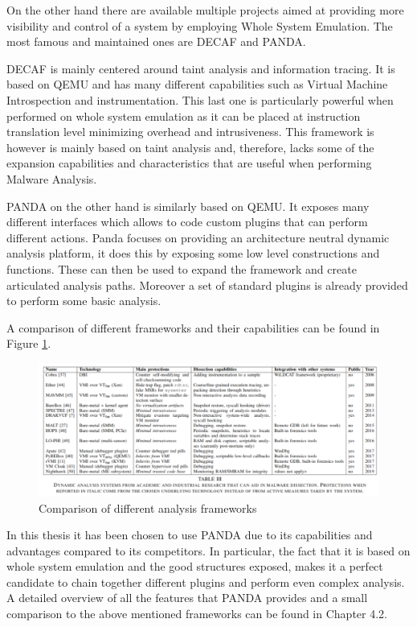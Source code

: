 On the other hand there are available multiple projects aimed at providing more visibility and control of a system by employing Whole System Emulation. The most famous and maintained ones are DECAF and PANDA. 

DECAF is mainly centered around taint analysis and information tracing. It is based on QEMU and has many different capabilities such as Virtual Machine Introspection and instrumentation. This last one is particularly powerful when performed on whole system emulation as it can be placed at instruction translation level minimizing overhead and intrusiveness. This framework is however is mainly based on taint analysis and, therefore, lacks some of the expansion capabilities and characteristics that are useful when performing Malware Analysis. 

PANDA on the other hand is similarly based on QEMU. It exposes many different interfaces which allows to code custom plugins that can perform different actions. Panda focuses on providing an architecture neutral dynamic analysis platform, it does this by exposing some low level constructions and functions. These can then be used to expand the framework and create articulated analysis paths. Moreover a set of standard plugins is already provided to perform some basic analysis.

A comparison of different frameworks and their capabilities can be found in Figure \ref{fig:frcmp}.

\begin{figure}[htp]
\centering
\includegraphics[width=\linewidth]{images/framcomp.png}
\caption{Comparison of different analysis frameworks \cite{9018111}}
\label{fig:frcmp}
\end{figure}

In this thesis it has been chosen to use PANDA due to its capabilities and advantages compared to its competitors. In particular, the fact that it is based on whole system emulation and the good structures exposed, makes it a perfect candidate to chain together different plugins and perform even complex analysis. A detailed overview of all the features that PANDA provides and a small comparison to the above mentioned frameworks can be found in Chapter 4.2.